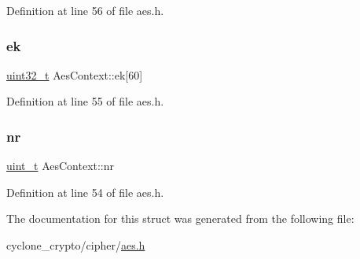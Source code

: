 Definition at line 56 of file aes.\+h.

\mbox{\label{structAesContext_ad8944ec0ee52c01192e26e18120dfab4}} 
\subsubsection{\texorpdfstring{ek}{ek}}
{\footnotesize\ttfamily \hyperlink{stdint_8h_a435d1572bf3f880d55459d9805097f62}{uint32\+\_\+t} Aes\+Context\+::ek\mbox{[}60\mbox{]}}



Definition at line 55 of file aes.\+h.

\mbox{\label{structAesContext_aabd0cf2167c7b59f419dda6d0ed9c9ad}} 
\subsubsection{\texorpdfstring{nr}{nr}}
{\footnotesize\ttfamily \hyperlink{compiler__port_8h_a12a1e9b3ce141648783a82445d02b58d}{uint\+\_\+t} Aes\+Context\+::nr}



Definition at line 54 of file aes.\+h.



The documentation for this struct was generated from the following file\+:\begin{DoxyCompactItemize}
\item 
cyclone\+\_\+crypto/cipher/\hyperlink{aes_8h}{aes.\+h}\end{DoxyCompactItemize}
